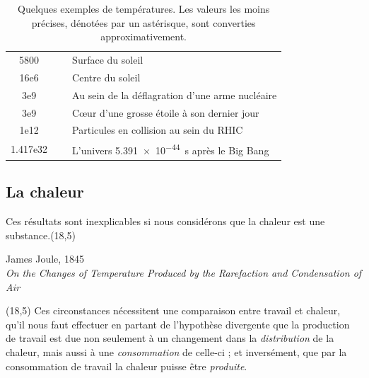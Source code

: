 \begin{table}
\begin{scriptsize}
\begin{spacing}{1}
\begin{innersidebox}
\begin{tabularx}{\textwidth}{@{}S@{}S|p{8cm}@{}}
			5800	& ~		& Surface du soleil \\
			16e6	& ~		& Centre du soleil \\
			3e9	& ~		& Au sein de la déflagration d’une arme nucléaire \\
			3e9	& ~		& Cœur d’une grosse étoile à son dernier jour \\
			1e12	& ~		& Particules en collision au sein du RHIC \\
			1.417e32	& ~	& L’univers \SI{5,391e-44}{\second} après le Big Bang \\
			\hline
		\end{tabularx}
		\end{innersidebox}
		\end{spacing}
		\end{scriptsize}
		\caption{Quelques exemples de températures. Les valeurs les moins précises, dénotées par un astérisque, sont converties approximativement.}\vspace{0.5em}%
		\label{tab_temperatures}
		\end{table}
		
		
	\subsection{La chaleur}
	
			Ces résultats sont inexplicables si nous considérons que la chaleur est une substance.\nolinebreak\makebox(18,5){\color{gray}}\par\vspace{-0.3cm}\begin{flushright}James Joule, 1845\\\textit{On the Changes of Temperature Produced by the Rarefaction and Condensation of Air}~\cite{joule1845}\end{flushright}\vspace{-1em}
		\makebox(18,5){\color{gray}}
			Ces circonstances \jecourte nécessitent une comparaison entre travail et chaleur, qu’il nous faut effectuer en partant de l’hypothèse divergente que la production de travail est due non seulement à un changement dans la \emph{distribution} de la chaleur, mais aussi à une \emph{consommation} de celle-ci ; et inversément, que par la consommation de travail la chaleur puisse être \emph{produite}.

